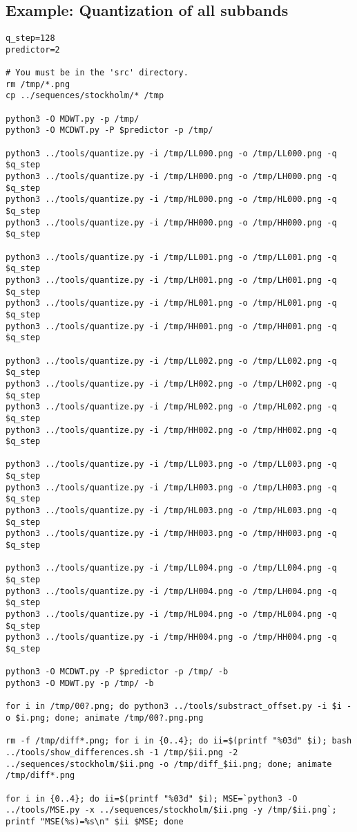 \subsection*{Example: Quantization of all subbands}
\begin{verbatim}
q_step=128
predictor=2

# You must be in the 'src' directory.
rm /tmp/*.png
cp ../sequences/stockholm/* /tmp

python3 -O MDWT.py -p /tmp/
python3 -O MCDWT.py -P $predictor -p /tmp/

python3 ../tools/quantize.py -i /tmp/LL000.png -o /tmp/LL000.png -q $q_step
python3 ../tools/quantize.py -i /tmp/LH000.png -o /tmp/LH000.png -q $q_step
python3 ../tools/quantize.py -i /tmp/HL000.png -o /tmp/HL000.png -q $q_step
python3 ../tools/quantize.py -i /tmp/HH000.png -o /tmp/HH000.png -q $q_step

python3 ../tools/quantize.py -i /tmp/LL001.png -o /tmp/LL001.png -q $q_step
python3 ../tools/quantize.py -i /tmp/LH001.png -o /tmp/LH001.png -q $q_step
python3 ../tools/quantize.py -i /tmp/HL001.png -o /tmp/HL001.png -q $q_step
python3 ../tools/quantize.py -i /tmp/HH001.png -o /tmp/HH001.png -q $q_step

python3 ../tools/quantize.py -i /tmp/LL002.png -o /tmp/LL002.png -q $q_step
python3 ../tools/quantize.py -i /tmp/LH002.png -o /tmp/LH002.png -q $q_step
python3 ../tools/quantize.py -i /tmp/HL002.png -o /tmp/HL002.png -q $q_step
python3 ../tools/quantize.py -i /tmp/HH002.png -o /tmp/HH002.png -q $q_step

python3 ../tools/quantize.py -i /tmp/LL003.png -o /tmp/LL003.png -q $q_step
python3 ../tools/quantize.py -i /tmp/LH003.png -o /tmp/LH003.png -q $q_step
python3 ../tools/quantize.py -i /tmp/HL003.png -o /tmp/HL003.png -q $q_step
python3 ../tools/quantize.py -i /tmp/HH003.png -o /tmp/HH003.png -q $q_step

python3 ../tools/quantize.py -i /tmp/LL004.png -o /tmp/LL004.png -q $q_step
python3 ../tools/quantize.py -i /tmp/LH004.png -o /tmp/LH004.png -q $q_step
python3 ../tools/quantize.py -i /tmp/HL004.png -o /tmp/HL004.png -q $q_step
python3 ../tools/quantize.py -i /tmp/HH004.png -o /tmp/HH004.png -q $q_step

python3 -O MCDWT.py -P $predictor -p /tmp/ -b
python3 -O MDWT.py -p /tmp/ -b 

for i in /tmp/00?.png; do python3 ../tools/substract_offset.py -i $i -o $i.png; done; animate /tmp/00?.png.png

rm -f /tmp/diff*.png; for i in {0..4}; do ii=$(printf "%03d" $i); bash ../tools/show_differences.sh -1 /tmp/$ii.png -2 ../sequences/stockholm/$ii.png -o /tmp/diff_$ii.png; done; animate /tmp/diff*.png

for i in {0..4}; do ii=$(printf "%03d" $i); MSE=`python3 -O ../tools/MSE.py -x ../sequences/stockholm/$ii.png -y /tmp/$ii.png`; printf "MSE(%s)=%s\n" $ii $MSE; done
\end{verbatim}

